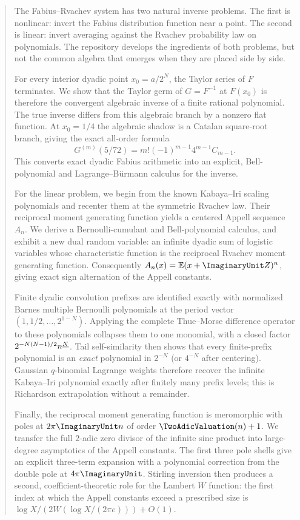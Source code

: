 \documentclass[11pt,oneside]{article}
\numberwithin{equation}{section}
\theoremstyle{definition}
\theoremstyle{remark}
\begin{document}
\hypersetup{pageanchor=false}

\hypersetup{pageanchor=true}

\begin{abstract}
The Fabius--Rvachev system has two natural inverse problems.  The first is nonlinear: invert the
Fabius distribution function near a point.  The second is linear: invert averaging against the
Rvachev probability law on polynomials.  The repository develops the ingredients of both problems,
but not the common algebra that emerges when they are placed side by side.

For every interior dyadic point $x_0=a/2^N$, the Taylor series of $F$ terminates.  We show that the
Taylor germ of $G=F^{-1}$ at $F(x_0)$ is therefore the convergent algebraic inverse of a finite
rational polynomial.  The true inverse differs from this algebraic branch by a nonzero flat function.
At $x_0=1/4$ the algebraic shadow is a Catalan square-root branch, giving the exact all-order formula
\[
 G^{(m)}(5/72)=m!(-1)^{m-1}4^{m-1}C_{m-1}.
\]
This converts exact dyadic Fabius arithmetic into an explicit, Bell-polynomial and
Lagrange--B\"urmann calculus for the inverse.

For the linear problem, we begin from the known Kabaya--Iri scaling polynomials and recenter them
at the symmetric Rvachev law.  Their reciprocal moment generating function yields a centered Appell
sequence $A_n$.  We derive a Bernoulli-cumulant and Bell-polynomial calculus, and exhibit a new
dual random variable: an infinite dyadic sum of logistic variables whose characteristic function is
the reciprocal Rvachev moment generating function.  Consequently
$A_n(x)=\mathbb E(x+\ImaginaryUnit Z)^n$, giving exact sign alternation of the Appell constants.

Finite dyadic convolution prefixes are identified exactly with normalized Barnes multiple Bernoulli
polynomials at the period vector $(1,1/2,\ldots,2^{1-N})$.  Applying the complete Thue--Morse
difference operator to these polynomials collapses them to one monomial, with a closed factor
$2^{-N(N-1)/2}\fall nN$.  Tail self-similarity then shows that every finite-prefix polynomial is an
\emph{exact} polynomial in $2^{-N}$ (or $4^{-N}$ after centering).  Gaussian $q$-binomial Lagrange
weights therefore recover the infinite Kabaya--Iri polynomial exactly after finitely many prefix
levels; this is Richardson extrapolation without a remainder.

Finally, the reciprocal moment generating function is meromorphic with poles at $2\pi\ImaginaryUnit n$ of
order $\TwoAdicValuation(n)+1$.  We transfer the full $2$-adic zero divisor of the infinite sinc product into
large-degree asymptotics of the Appell constants.  The first three pole shells give an explicit
three-term expansion with a polynomial correction from the double pole at $4\pi\ImaginaryUnit$.  Stirling
inversion then produces a second, coefficient-theoretic role for the Lambert $W$ function: the first
index at which the Appell constants exceed a prescribed size is
$\log X/(2W(\log X/(2\pi e)))+O(1)$.
\end{abstract}
\end{document}
